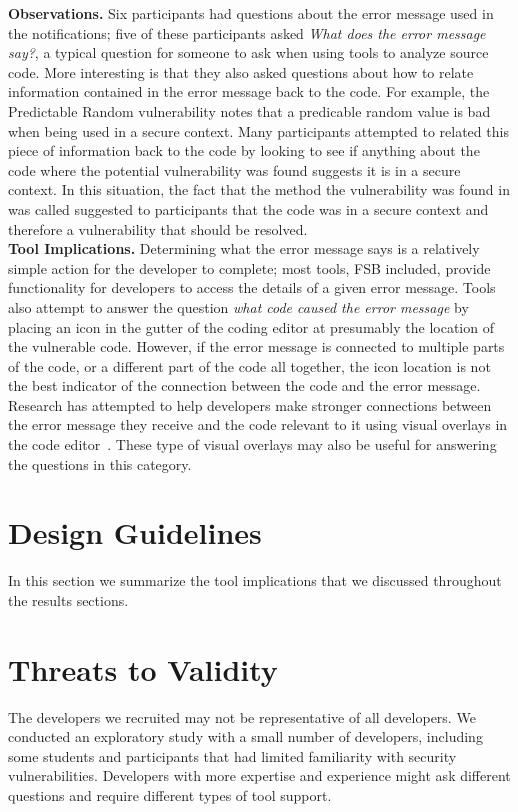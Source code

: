 \documentclass[conference]{IEEEtran}
\begin{document}
\noindent\textbf{Observations.}
Six participants had questions about the error message used in the notifications; five of these participants asked \textit{What does the error message say?}, a typical question for someone to ask when using tools to analyze source code.
More interesting is that they also asked questions about how to relate information contained in the error message back to the code. 
For example, the Predictable Random vulnerability notes that a predicable random value is bad when being used in a secure context. 
Many participants attempted to related this piece of information back to the code by looking to see if anything about the code where the potential vulnerability was found suggests it is in a secure context. 
In this situation, the fact that the method the vulnerability was found in was called  suggested to participants that the code was in a secure context and therefore a vulnerability that should be resolved.
\\

\noindent\textbf{Tool Implications.}
Determining what the error message says is a relatively simple action for the developer to complete; most tools, FSB included, provide functionality for developers to access the details of a given error message. 
Tools also attempt to answer the question \emph{what code caused the error message} by placing an icon in the gutter of the coding editor at presumably the location of the vulnerable code. 
However, if the error message is connected to multiple parts of the code, or a different part of the code all together, the icon location is not the best indicator of the connection between the code and the error message. 
Research has attempted to help developers make stronger connections between the error message they receive and the code relevant to it using visual overlays in the code editor~\cite{barik14visual}.
These type of visual overlays may also be useful for answering the questions in this category.

\section{Design Guidelines}
In this section we summarize the tool implications that we discussed throughout the results sections.

\section{Threats to Validity}
\label{limits}
The developers we recruited may not be representative of all developers.
We conducted an exploratory study with a small number of developers, including some students and participants that had limited familiarity with security vulnerabilities.
Developers with more expertise and experience might ask different questions and require different types of tool support.
\end{document}

